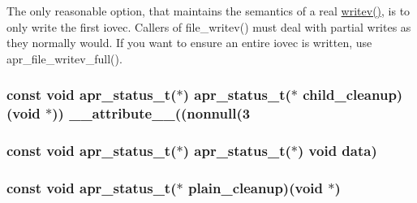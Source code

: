 The only reasonable option, that maintains the semantics of a real \hyperlink{apr__arch__os2calls_8h_a3d0f3996136a9b5ab46431c60c746efd}{writev()}, is to only write the first iovec. Callers of file\+\_\+writev() must deal with partial writes as they normally would. If you want to ensure an entire iovec is written, use apr\+\_\+file\+\_\+writev\+\_\+full().
\subsubsection[{\texorpdfstring{child\+\_\+cleanup}{child_cleanup}}]{\setlength{\rightskip}{0pt plus 5cm}const {\bf void} {\bf apr\+\_\+status\+\_\+t}($\ast$) {\bf apr\+\_\+status\+\_\+t}($\ast$ child\+\_\+cleanup) ({\bf void} $\ast$)) {\bf \+\_\+\+\_\+attribute\+\_\+\+\_\+}((nonnull(3}\hypertarget{group__PoolCleanup_ga09accdea610fa869f6e853529fd584f1}{}\label{group__PoolCleanup_ga09accdea610fa869f6e853529fd584f1}
\subsubsection[{\texorpdfstring{data}{data}}]{\setlength{\rightskip}{0pt plus 5cm}const {\bf void} {\bf apr\+\_\+status\+\_\+t}($\ast$) {\bf apr\+\_\+status\+\_\+t}($\ast$) {\bf void} {\bf data}) }\hypertarget{group__PoolCleanup_ga759cdc4d96e9faaa06ff1cc8ec7962f6}{}\label{group__PoolCleanup_ga759cdc4d96e9faaa06ff1cc8ec7962f6}
\subsubsection[{\texorpdfstring{plain\+\_\+cleanup}{plain_cleanup}}]{\setlength{\rightskip}{0pt plus 5cm}const {\bf void} {\bf apr\+\_\+status\+\_\+t}($\ast$ plain\+\_\+cleanup)({\bf void} $\ast$)}\hypertarget{group__PoolCleanup_ga329cbf0c5d8e0c61c40f78cdf67d4471}{}\label{group__PoolCleanup_ga329cbf0c5d8e0c61c40f78cdf67d4471}
